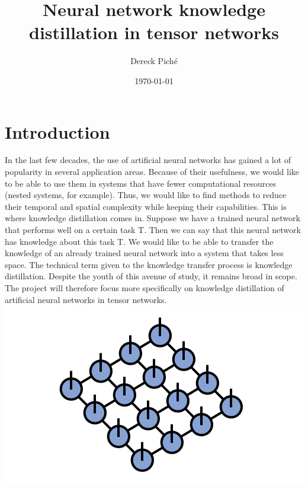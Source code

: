 \documentclass[11pt]{article}
\title{Neural network knowledge distillation in tensor networks}
\author{Dereck Piché}
\date{\today}
\begin{document}
\maketitle
\begin{abstract}
\end{abstract}

\section{Introduction}
In the last few decades, the use of artificial neural networks has gained a lot of popularity in several application areas. Because of their usefulness, we would like to be able to use them in systems that have fewer computational resources (nested systems, for example). Thus, we would like to find methods to reduce their temporal and spatial complexity while keeping their capabilities. This is where knowledge distillation comes in. Suppose we have a trained neural network that performs well on a certain task T. Then we can say that this neural network has knowledge about this task T. We would like to be able to transfer the knowledge of an already trained neural network into a system that takes less space. The technical term given to the knowledge transfer process is knowledge distillation. Despite the youth of this avenue of study, it remains broad in scope. The project will therefore focus more specifically on knowledge distillation of artificial neural networks in tensor networks. 
\includegraphics{PEPS}
\end{document}
